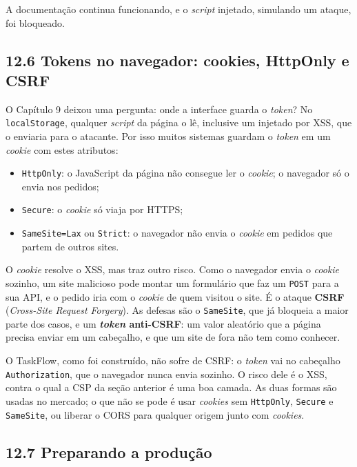 A documentação continua funcionando, e o \textit{script} injetado, simulando um ataque, foi bloqueado.

\subsection{12.6 Tokens no navegador: cookies, HttpOnly e CSRF}

O Capítulo 9 deixou uma pergunta: onde a interface guarda o \textit{token}? No \texttt{localStorage}, qualquer \textit{script} da página o lê, inclusive um injetado por XSS, que o enviaria para o atacante. Por isso muitos sistemas guardam o \textit{token} em um \textit{cookie} com estes atributos:

\begin{itemize}
  \item \texttt{HttpOnly}: o JavaScript da página não consegue ler o \textit{cookie}; o navegador só o envia nos pedidos;
  \item \texttt{Secure}: o \textit{cookie} só viaja por HTTPS;
  \item \texttt{SameSite=Lax} ou \texttt{Strict}: o navegador não envia o \textit{cookie} em pedidos que partem de outros sites.
\end{itemize}

O \textit{cookie} resolve o XSS, mas traz outro risco. Como o navegador envia o \textit{cookie} sozinho, um site malicioso pode montar um formulário que faz um \texttt{POST} para a sua API, e o pedido iria com o \textit{cookie} de quem visitou o site. É o ataque \textbf{CSRF} (\textit{Cross-Site Request Forgery}). As defesas são o \texttt{SameSite}, que já bloqueia a maior parte dos casos, e um \textbf{\textit{token} anti-CSRF}: um valor aleatório que a página precisa enviar em um cabeçalho, e que um site de fora não tem como conhecer.

O TaskFlow, como foi construído, não sofre de CSRF: o \textit{token} vai no cabeçalho \texttt{Authorization}, que o navegador nunca envia sozinho. O risco dele é o XSS, contra o qual a CSP da seção anterior é uma boa camada. As duas formas são usadas no mercado; o que não se pode é usar \textit{cookies} sem \texttt{HttpOnly}, \texttt{Secure} e \texttt{SameSite}, ou liberar o CORS para qualquer origem junto com \textit{cookies}.

\subsection{12.7 Preparando a produção}

